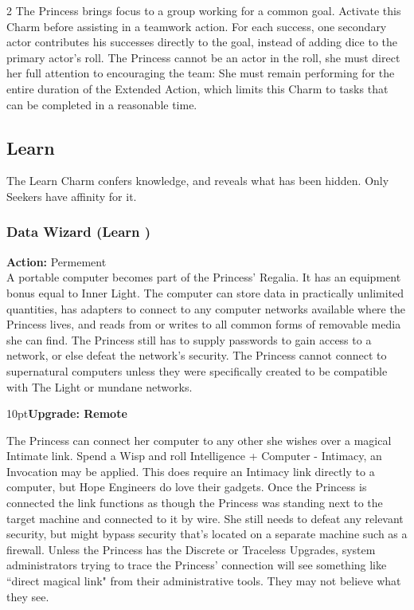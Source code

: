 \begin{multicols}{2}
\noindent The Princess brings focus to a group working for a common goal. Activate this Charm before assisting in a teamwork action. For each success, one secondary actor contributes his successes directly to the goal, instead of adding dice to the primary actor's roll. The Princess cannot be an actor in the roll, she must direct her full attention to encouraging the team: She must remain performing for the entire duration of the Extended Action, which limits this Charm to tasks that can be completed in a reasonable time.  

\subsection*{Learn}
\label{subsec:Learn}
The Learn Charm confers knowledge, and reveals what has been hidden. Only Seekers have affinity for it.

\subsubsection*{Data Wizard (Learn \textbullet)}

\noindent \textbf{Action:} Permement \\

\noindent A portable computer becomes part of the Princess’ Regalia. It has an equipment bonus equal to Inner Light. The computer can store data in practically unlimited quantities, has adapters to connect to any computer networks available where the Princess lives, and reads from or writes to all common forms of removable media she can find. The Princess still has to supply passwords to gain access to a network, or else defeat the network’s security. The Princess cannot connect to supernatural computers unless they were specifically created to be compatible with The Light or mundane networks. 

\begin{myindentpar}{10pt}\textbf{Upgrade: Remote}

The Princess can connect her computer to any other she wishes over a magical Intimate link. Spend a Wisp and roll Intelligence + Computer - Intimacy, an Invocation may be applied. This does require an Intimacy link directly to a computer, but Hope Engineers do love their gadgets. Once the Princess is connected the link functions as though the Princess was standing next to the target machine and connected to it by wire. She still needs to defeat any relevant security, but might bypass security that's located on a separate machine such as a firewall. Unless the Princess has the Discrete or Traceless Upgrades, system administrators trying to trace the Princess' connection will see something like \textquotedblleft direct magical link" from their administrative tools. They may not believe what they see. 


\end{myindentpar}
\end{multicols}
